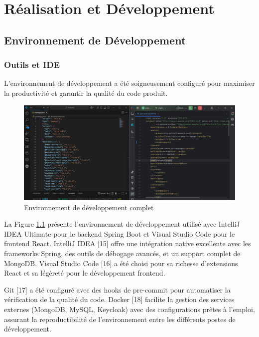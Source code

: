 \chapter{Réalisation et Développement}

\section{Environnement de Développement}

\subsection{Outils et IDE}

L'environnement de développement a été soigneusement configuré pour maximiser la productivité et garantir la qualité du code produit. 

\begin{figure}[H]
\centering
\includegraphics[width=1.0\textwidth]{images/dev_environment.png}
\caption{Environnement de développement complet}
\label{fig:dev_environment}
\end{figure}

La Figure \ref{fig:dev_environment} présente l'environnement de développement utilisé avec IntelliJ IDEA Ultimate pour le backend Spring Boot et Visual Studio Code pour le frontend React. IntelliJ IDEA [15] offre une intégration native excellente avec les frameworks Spring, des outils de débogage avancés, et un support complet de MongoDB. Visual Studio Code [16] a été choisi pour sa richesse d'extensions React et sa légèreté pour le développement frontend.

Git [17] a été configuré avec des hooks de pre-commit pour automatiser la vérification de la qualité du code. Docker [18] facilite la gestion des services externes (MongoDB, MySQL, Keycloak) avec des configurations prêtes à l'emploi, assurant la reproductibilité de l'environnement entre les différents postes de développement.

